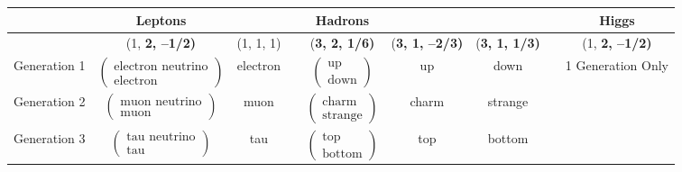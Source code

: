 \documentclass[12pt,epsf]{article}
\begin{document}
\begin{table}
\begin{tabular}{|c|c|c|c|c|c|c|c|c|}
\hline
 & Leptons & & & Hadrons & & & & Higgs \\
 \hline
  & (1, \bf 2\rm, --1/2) & (1, 1, 1) & & (\bf 3\rm, \bf 2\rm, 1/6) & (\bf 3\rm, 1, --2/3) & (\bf 3\rm, 1, 1/3) & & (1, \bf 2\rm, --1/2)  \\
\hline
Generation 1 & $\begin{pmatrix} \mbox{electron neutrino} \\ \mbox{electron} \end{pmatrix}$ & \mbox{electron} & & $\begin{pmatrix} \mbox{up} \\
 \mbox{down} \end{pmatrix}$  & \mbox{up} & \mbox{down} & & 1 Generation Only \\
\hline
Generation 2 & $\begin{pmatrix} \mbox{muon neutrino} \\ \mbox{muon} \end{pmatrix}$ & \mbox{muon} & & $\begin{pmatrix} \mbox{charm} \\
 \mbox{strange} \end{pmatrix}$  & \mbox{charm} & \mbox{strange} & &   \\
\hline
Generation 3 & $\begin{pmatrix} \mbox{tau neutrino} \\ \mbox{tau} \end{pmatrix}$ & \mbox{tau} & & $\begin{pmatrix} \mbox{top} \\
 \mbox{bottom} \end{pmatrix}$  & \mbox{top} & \mbox{bottom} & &  \\
\hline
\end{tabular} \label{standardmodelsummary}
\end{table}


\newpage
\end{document}
